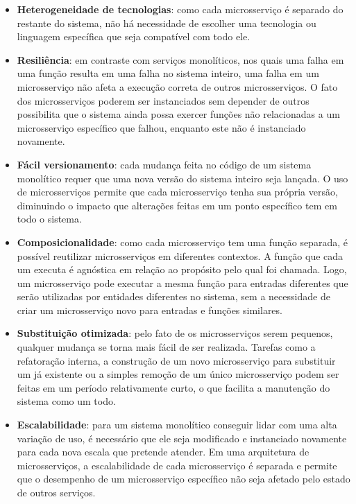 \begin{itemize}
\item \textbf{Heterogeneidade de tecnologias}: como cada microsserviço é separado do restante do sistema, não há necessidade de escolher uma tecnologia ou linguagem específica que seja compatível com todo ele. 
\item \textbf{Resiliência}: em contraste com serviços monolíticos, nos quais uma falha em uma função resulta em uma falha no sistema inteiro, uma falha em um microsserviço não afeta a execução correta de outros microsserviços. O fato dos microsserviços poderem ser instanciados sem depender de outros possibilita que o sistema ainda possa exercer funções não relacionadas a um microsserviço específico que falhou, enquanto este não é instanciado novamente. 
\item \textbf{Fácil versionamento}: cada mudança feita no código de um sistema monolítico requer que uma nova versão do sistema inteiro seja lançada. O uso de microsserviços permite que cada microsserviço tenha sua própria versão, diminuindo o impacto que alterações feitas em um ponto específico tem em todo o sistema. 
\item \textbf{Composicionalidade}: como cada microsserviço tem uma função separada, é possível reutilizar microsserviços em diferentes contextos. A função que cada um executa é agnóstica em relação ao propósito pelo qual foi chamada. Logo, um microsserviço pode executar a mesma função para entradas diferentes que serão utilizadas por entidades diferentes no sistema, sem a necessidade de criar um microsserviço novo para entradas e funções similares. 
\item \textbf{Substituição otimizada}: pelo fato de os microsserviços serem pequenos, qualquer mudança se torna mais fácil de ser realizada. Tarefas como a refatoração interna, a construção de um novo microsserviço para substituir um já existente ou a simples remoção de um único microsserviço podem ser feitas em um período relativamente curto, o que facilita a manutenção do sistema como um todo. 
\item \textbf{Escalabilidade}: para um sistema monolítico conseguir lidar com uma alta variação de uso, é necessário que ele seja modificado e instanciado novamente para cada nova escala que pretende atender. Em uma arquitetura de microsserviços, a escalabilidade de cada microsserviço é separada e permite que o desempenho de um microsserviço específico não seja afetado pelo estado de outros serviços. 
\end{itemize}

